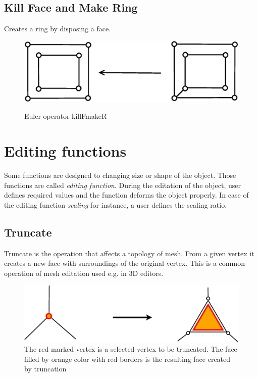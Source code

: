 \subsection{Kill Face and Make Ring}

Creates a ring by disposing a face.

\begin{figure}[H]
\centering
\includegraphics[scale=0.25]{../img/killFmakeR.eps}
\label{fig:killfmaker}
\caption{Euler operator killFmakeR}
\end{figure}


\section{Editing functions}

Some functions are designed to changing size or shape of the object. Those functions are called 
\emph{editing function}.
During the editation of the object, user defines required values and the function deforms the
object properly. In case of the editing function \emph{scaling} for instance, a user defines the scaling
ratio.

\subsection{Truncate}

Truncate is the operation that affects a topology of mesh. From a given vertex it creates a new face with
surroundings of the original vertex. This is a common operation of mesh editation used e.g. in
3D editors.\\

\begin{figure}[ht]
\centering
\includegraphics[scale=0.2]{../img/truncate.eps}
\caption{The red-marked vertex is a selected vertex to be truncated.
The face filled by orange color with red borders is the resulting face created by truncation}
\end{figure}

